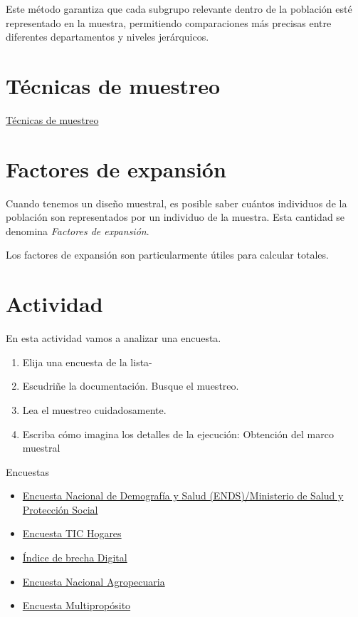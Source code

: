 \documentclass[
  letterpaper,
  DIV=11,
  numbers=noendperiod]{scrreprt}
\providecommand{\tightlist}{%
  \setlength{\itemsep}{0pt}\setlength{\parskip}{0pt}}\usepackage{longtable,booktabs,array}
\begin{document}
Este método garantiza que cada subgrupo relevante dentro de la población
esté representado en la muestra, permitiendo comparaciones más precisas
entre diferentes departamentos y niveles jerárquicos.

\section{Técnicas de muestreo}\label{tuxe9cnicas-de-muestreo}

\href{https://youtu.be/gyGQ_qieVKM}{Técnicas de muestreo}

\section{Factores de expansión}\label{factores-de-expansiuxf3n}

Cuando tenemos un diseño muestral, es posible saber cuántos individuos
de la población son representados por un individuo de la muestra. Esta
cantidad se denomina \emph{Factores de expansión}.

Los factores de expansión son particularmente útiles para calcular
totales.

\section{Actividad}\label{actividad-1}

En esta actividad vamos a analizar una encuesta.

\begin{enumerate}
\def\labelenumi{\arabic{enumi}.}
\item
  Elija una encuesta de la lista-
\item
  Escudriñe la documentación. Busque el muestreo.
\item
  Lea el muestreo cuidadosamente.
\item
  Escriba cómo imagina los detalles de la ejecución: Obtención del marco
  muestral
\end{enumerate}

Encuestas

\begin{itemize}
\tightlist
\item
  \href{https://profamilia.org.co/investigaciones/ends/}{Encuesta
  Nacional de Demografía y Salud (ENDS)/Ministerio de Salud y Protección
  Social}
\item
  \href{https://colombiatic.mintic.gov.co/679/w3-article-198835.html}{Encuesta
  TIC Hogares}
\item
  \href{https://colombiatic.mintic.gov.co/679/w3-article-333031.html}{Índice
  de brecha Digital}
\item
  \href{https://www.dane.gov.co/index.php/estadisticas-por-tema/agropecuario/encuesta-nacional-agropecuaria-ena}{Encuesta
  Nacional Agropecuaria}
\item
  \href{https://www.sdp.gov.co/gestion-estudios-estrategicos/estudios-macro/encuesta-multiproposito/resultados}{Encuesta
  Multipropósito}
\end{itemize}
\end{document}
